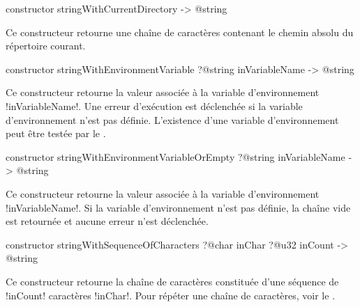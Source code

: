 
\begin{galgas4box}
constructor stringWithCurrentDirectory -> @string
\end{galgas4box}

Ce constructeur retourne une chaîne de caractères contenant le chemin absolu du répertoire courant.





\begin{galgas4box}
constructor stringWithEnvironmentVariable
  ?@string inVariableName
  -> @string
\end{galgas4box}

Ce constructeur retourne la valeur associée à la variable d'environnement \ggsq!inVariableName!. Une erreur d'exécution est déclenchée si la variable d'environnement n'est pas définie. L'existence d'une variable d'environnement peut être testée par le .






\begin{galgas4box}
constructor stringWithEnvironmentVariableOrEmpty
  ?@string inVariableName
  -> @string
\end{galgas4box}

Ce constructeur retourne la valeur associée à la variable d'environnement \ggsq!inVariableName!. Si la variable d'environnement n'est pas définie, la chaîne vide est retournée et aucune erreur n'est déclenchée.







\begin{galgas4box}
constructor stringWithSequenceOfCharacters
  ?@char inChar
  ?@u32 inCount
  -> @string
\end{galgas4box}

Ce constructeur retourne la chaîne de caractères constituée d'une séquence de \ggsq!inCount! caractères \ggsq!inChar!. Pour répéter une chaîne de caractères, voir le .





